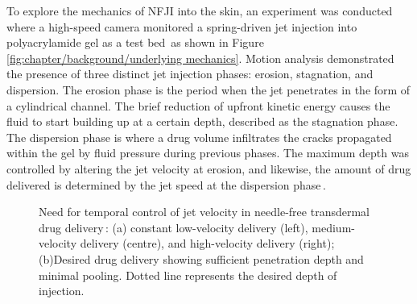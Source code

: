         To explore the mechanics of NFJI into the skin, an experiment was conducted where a high-speed camera monitored a spring-driven jet injection into polyacrylamide gel as a test bed\,\cite{Schramm-Baxter2004b} as shown in Figure\,\ref{fig:chapter/background/underlying mechanics}. Motion analysis demonstrated the presence of three distinct jet injection phases: erosion, stagnation, and dispersion. The erosion phase is the period when the jet penetrates in the form of a cylindrical channel. The brief reduction of upfront kinetic energy causes the fluid to start building up at a certain depth, described as the stagnation phase. The dispersion phase is where a drug volume infiltrates the cracks propagated within the gel by fluid pressure during previous phases. The maximum depth was controlled by altering the jet velocity at erosion, and likewise, the amount of drug delivered is determined by the jet speed at the dispersion phase\,\cite{Stachowiak2009}.
        
        
        \begin{figure}[!ht]
            \centering
            \qquad
            \caption[LoF entry]{
                Need for temporal control of jet velocity in needle-free transdermal drug delivery\,\cite{Mitragotri2005}: (a) constant low-velocity delivery (left), medium-velocity delivery (centre), and high-velocity delivery (right); (b)Desired drug delivery showing sufficient penetration depth and minimal pooling. Dotted line represents the desired depth of injection.
            }   \label{fig:chapter/background/2 speeds mechanics}
        \end{figure}
        
